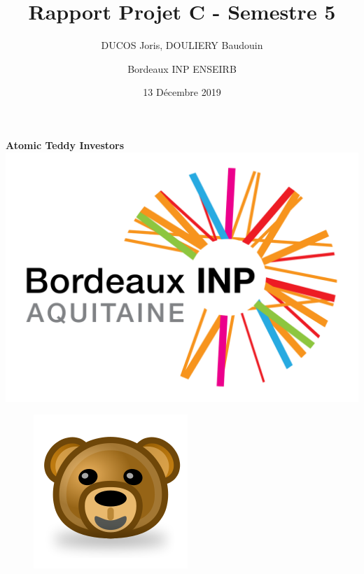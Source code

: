 \documentclass{article}
\begin{document}
\pagestyle{fancy}

\lhead{}
\rhead{}

\title{Rapport Projet C - Semestre 5}
\author{DUCOS Joris, DOULIERY Baudouin 
\and Bordeaux INP ENSEIRB}
\date{13 D\'ecembre 2019}
\maketitle
\begin{center}
  \centering
  \huge
  \textbf{Atomic Teddy Investors} \\
  \includegraphics[scale=0.1]{Logo_INPB.png}
  \end{center}



\newpage
\newpage

\begin{figure}[t]
  \centering
  \includegraphics[scale=0.5]{teddy.png}
\end{figure}


\newpage

\tableofcontents
\end{document}
